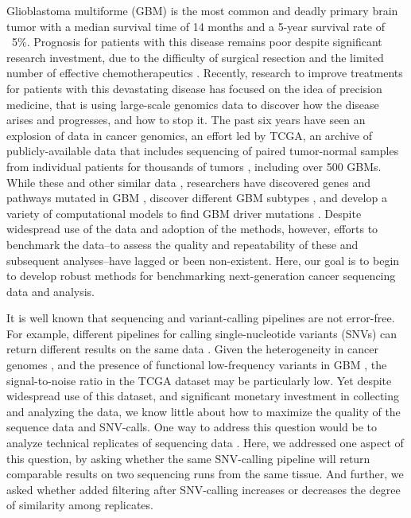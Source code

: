 \documentclass[11 pt]{article} %
\begin{document}
Glioblastoma multiforme (GBM) is the most common and deadly primary brain tumor with a median survival time of 14 months and a 5-year survival rate of ~5\%. Prognosis for patients with this disease remains poor despite significant research investment, due to the difficulty of surgical resection and the limited number of effective chemotherapeutics \citep{GBM-stats}. Recently, research to improve treatments for patients with this devastating disease has focused on the idea of precision medicine, that is using large-scale genomics data to discover how the disease arises and progresses, and how to stop it. The past six years have seen an explosion of data in cancer genomics, an effort led by TCGA, an archive of publicly-available data that includes sequencing of paired tumor-normal samples from individual patients for thousands of tumors \citep{TCGA-GBM, TCGA-GBM-13}, including over 500 GBMs. While these and other similar data \citep{Parsons}, researchers have discovered genes and pathways mutated in GBM \citep{pathways}, discover different GBM subtypes \citep{subtypes}, and develop a variety of computational models to find GBM driver mutations \citep{drivers}.  Despite widespread use of the data and adoption of the methods, however, efforts to benchmark the data--to assess the quality and repeatability of these and subsequent analyses--have lagged or been non-existent. Here, our goal is to begin to develop robust methods for benchmarking next-generation cancer sequencing data and analysis.

It is well known that sequencing and variant-calling pipelines are not error-free. For example, different pipelines for calling single-nucleotide variants (SNVs) can return different results on the same data \citep{SNPcall}. Given the heterogeneity in cancer genomes \citep{heterogenous1, heterogenous2}, and the presence of functional low-frequency variants in GBM \citep{rare}, the signal-to-noise ratio in the TCGA dataset may be particularly low. Yet despite widespread use of this dataset, and significant monetary investment in collecting and analyzing the data, we know little about how to maximize the quality of the sequence data and SNV-calls. One way to address this question would be to analyze technical replicates of sequencing data \citep{replicates}. Here, we addressed one aspect of this question, by asking whether the same SNV-calling pipeline will return comparable results on two sequencing runs from the same tissue. And further, we asked whether added filtering after SNV-calling increases or decreases the degree of similarity among replicates.
\end{document}
